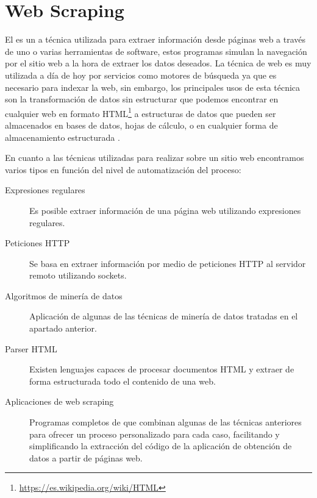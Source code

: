 \section{Web Scraping}
El  es un a técnica utilizada para extraer información desde páginas web a través de uno o varias herramientas de software, estos programas simulan la navegación por el sitio web a la hora de extraer los datos deseados. La técnica de web  es muy utilizada a día de hoy por servicios como motores de búsqueda ya que es necesario para indexar la web, sin embargo, los principales usos de esta técnica son la transformación de datos sin estructurar que podemos encontrar en cualquier web en formato HTML\footnote{\url{https://es.wikipedia.org/wiki/HTML}} a estructuras de datos que pueden ser almacenados en bases de datos, hojas de cálculo, o en cualquier forma de almacenamiento estructurada \cite{wiki:web_scraping}.

En cuanto a las técnicas utilizadas para realizar  sobre un sitio web encontramos varios tipos en función del nivel de automatización del proceso:

\begin{description}
    \item[Expresiones regulares] Es posible extraer información de una página web utilizando expresiones regulares.
    \item[Peticiones HTTP] Se basa en extraer información por medio de peticiones HTTP al servidor remoto utilizando sockets.
    \item[Algoritmos de minería de datos] Aplicación de algunas de las técnicas de minería de datos tratadas en el apartado anterior.
    \item[Parser HTML] Existen lenguajes capaces de procesar documentos HTML y extraer de forma estructurada todo el contenido de una web.
    \item[Aplicaciones de web scraping] Programas completos de  que combinan algunas de las técnicas anteriores para ofrecer un proceso personalizado para cada caso, facilitando y simplificando la extracción del código de la aplicación de obtención de datos a partir de páginas web.
\end{description}
